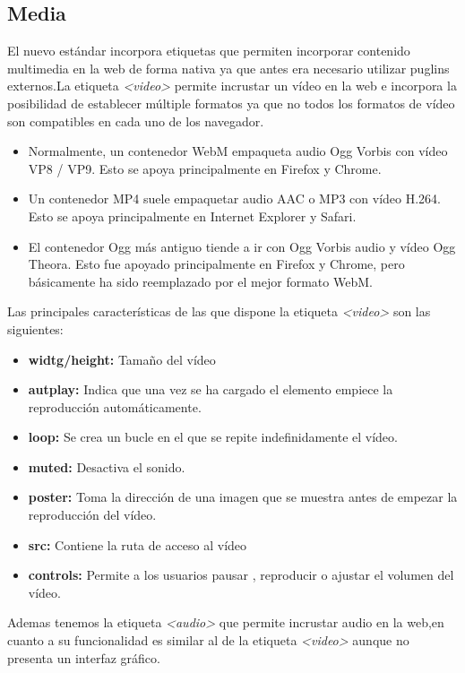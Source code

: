 \subsection{Media}
El nuevo estándar incorpora etiquetas que permiten incorporar contenido multimedia\cite{multimedia} en la web de forma nativa ya que antes era necesario utilizar puglins externos.La etiqueta \textit{<video>} permite incrustar un vídeo en la web e incorpora la posibilidad de establecer múltiple formatos ya que no todos los formatos de vídeo son compatibles en cada uno de los navegador.
\begin{itemize}
    \item Normalmente, un contenedor WebM empaqueta audio Ogg Vorbis con vídeo VP8 / VP9. Esto se apoya principalmente en Firefox y Chrome.
    \item Un contenedor MP4 suele empaquetar audio AAC o MP3 con vídeo H.264. Esto se apoya principalmente en Internet Explorer y Safari.
    \item El contenedor Ogg más antiguo tiende a ir con Ogg Vorbis audio y vídeo Ogg Theora. Esto fue apoyado principalmente en Firefox y Chrome, pero básicamente ha sido reemplazado por el mejor formato WebM. 
\end{itemize}
Las principales características de las que dispone la etiqueta \textit{<video>} son las siguientes:
\begin{itemize}
  \item\textbf{widtg/height:} Tamaño del vídeo
  \item \textbf{autplay:} Indica que una vez se ha cargado el elemento empiece la reproducción automáticamente.
  \item \textbf{loop:} Se crea un bucle en el que se repite indefinidamente el vídeo.
  \item \textbf{muted:} Desactiva el sonido.
  \item \textbf{poster:} Toma la dirección de una imagen que se muestra antes de empezar la reproducción del vídeo.
  \item \textbf{src:} Contiene la ruta de acceso al vídeo
  \item \textbf{controls:} Permite a los usuarios pausar , reproducir o ajustar el volumen del vídeo.
\end{itemize}
Ademas tenemos la etiqueta \textit{<audio>} que permite incrustar audio en la web,en cuanto a su funcionalidad es similar al de la etiqueta \textit{<video>} aunque no presenta un interfaz gráfico.
